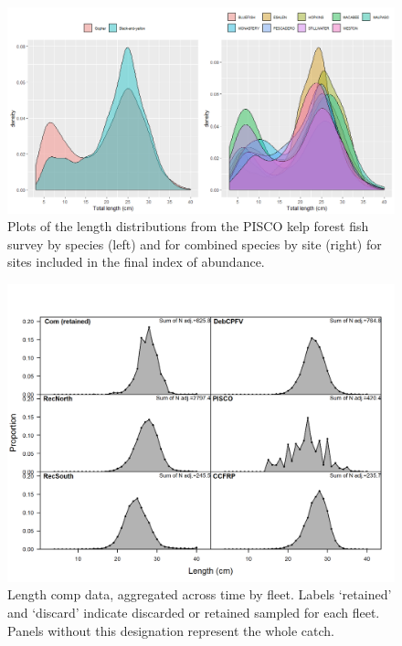 \documentclass[12pt,]{article}
\begin{document}
\FloatBarrier

\begin{figure}
\centering
\includegraphics{Figures/PISCO_lengths.png}
\caption{Plots of the length distributions from the PISCO kelp forest
fish survey by species (left) and for combined species by site (right)
for sites included in the final index of abundance.
\label{fig:PISCO_lengths}}
\end{figure}

\FloatBarrier

\begin{figure}
\centering
\includegraphics{r4ss/plots_mod1/comp_lendat__aggregated_across_time.png}
\caption{Length comp data, aggregated across time by fleet. Labels
`retained' and `discard' indicate discarded or retained sampled for each
fleet. Panels without this designation represent the whole catch.
\label{fig:comp_lendat_aggregated_across_time}}
\end{figure}
\end{document}
